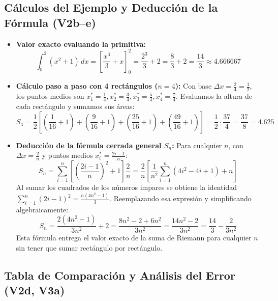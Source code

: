 \documentclass[10pt, a4paper]{article}
\begin{document}
\subsection{Cálculos del Ejemplo y Deducción de la Fórmula (V2b--e)}
\begin{itemize}[leftmargin=1.5em, itemsep=3pt, topsep=2pt]
    \item \textbf{Valor exacto evaluando la primitiva:}
    \[
    \int_0^2 (x^2 + 1)\,dx = \left[ \frac{x^3}{3} + x \right]_0^2 = \frac{2^3}{3} + 2 = \frac{8}{3} + 2 = \frac{14}{3} \approx 4.666667
    \]
    \item \textbf{Cálculo paso a paso con 4 rectángulos ($n=4$):} Con base $\Delta x = \frac{2}{4} = \frac{1}{2}$, los puntos medios son $x_1^* = \frac{1}{4}, x_2^* = \frac{3}{4}, x_3^* = \frac{5}{4}, x_4^* = \frac{7}{4}$. Evaluamos la altura de cada rectángulo y sumamos sus áreas:
    \[
    S_4 = \frac{1}{2}\left[\left(\frac{1}{16}+1\right) + \left(\frac{9}{16}+1\right) + \left(\frac{25}{16}+1\right) + \left(\frac{49}{16}+1\right)\right] = \frac{1}{2}\cdot\frac{37}{4} = \frac{37}{8} = 4.625
    \]
    \item \textbf{Deducción de la fórmula cerrada general $S_n$:}
    Para cualquier $n$, con $\Delta x = \frac{2}{n}$ y puntos medios $x_i^* = \frac{2i-1}{n}$:
    \[
    S_n = \sum_{i=1}^{n} \left[\left(\frac{2i-1}{n}\right)^2 + 1\right]\frac{2}{n} = \frac{2}{n}\left[\frac{1}{n^2}\sum_{i=1}^{n}(4i^2 - 4i + 1) + n\right]
    \]
    Al sumar los cuadrados de los números impares se obtiene la identidad $\sum_{i=1}^n (2i-1)^2 = \frac{n(4n^2-1)}{3}$. Reemplazando esa expresión y simplificando algebraicamente:
    \[
    S_n = \frac{2(4n^2-1)}{3n^2} + 2 = \frac{8n^2 - 2 + 6n^2}{3n^2} = \frac{14n^2 - 2}{3n^2} = \frac{14}{3} - \frac{2}{3n^2}
    \]
    Esta fórmula entrega el valor exacto de la suma de Riemann para cualquier $n$ sin tener que sumar rectángulo por rectángulo.
\end{itemize}

\subsection{Tabla de Comparación y Análisis del Error (V2d, V3a)}
\end{document}
